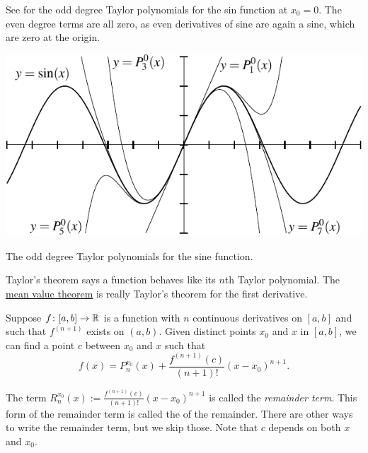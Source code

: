 See  for
the odd degree Taylor polynomials for the sin function at $x_0=0$.
The even degree terms are all zero, as even derivatives 
of sine are again a sine, which are zero at the origin.
\begin{myfigureht}
\includegraphics{figures/taylorsin}
\caption{The odd degree Taylor polynomials for the sine
function.\label{fig:taylorsin}}
\end{myfigureht}

Taylor's theorem says a function behaves like its $n$th
Taylor polynomial.  The 
\hyperref[thm:mvt]{mean value theorem} is really Taylor's theorem
for the first derivative.

\begin{thm}[Taylor] \label{thm:taylor}
Suppose $f \colon [a,b] \to {\mathbb{R}}$ is a function with $n$ continuous
derivatives on $[a,b]$ and such that $f^{(n+1)}$ exists on $(a,b)$.
Given distinct points $x_0$ and $x$ in $[a,b]$,
we can find a point $c$ between $x_0$
and $x$ such that
\begin{equation*}
f(x)=P_{n}^{x_0}(x)+\frac{f^{(n+1)}(c)}{(n+1)!}{(x-x_0)}^{n+1} .
\end{equation*}
\end{thm}

The term $R_n^{x_0}(x):=\frac{f^{(n+1)}(c)}{(n+1)!}{(x-x_0)}^{n+1}$ is called the
\emph{remainder term}.  This
form 
of the remainder term is called the
\emph{} of the remainder.  There are other ways
to write the remainder term, but we skip those.  Note that $c$ depends on
both $x$ and $x_0$.

